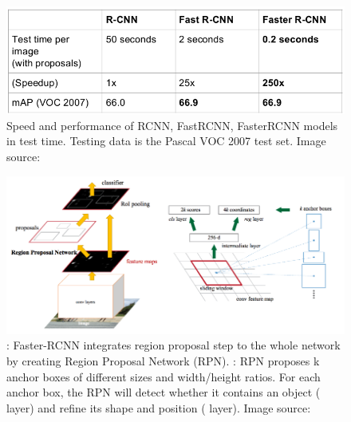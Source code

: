 \begin{figure}[tb]
	\centering
	\includegraphics[width=0.8\hsize]{./figures/rcnnCompair}
	\caption{Speed and performance of RCNN, FastRCNN, FasterRCNN models in test time. Testing data is the Pascal VOC 2007 test set. Image source: \cite{cs231n}}
	\label{fig:rcnnCompair}
\end{figure}

\begin{figure}[tb]
	\centering
	\includegraphics[width=1.0\hsize]{./figures/fasterRCNNfull}
	\caption{: Faster-RCNN integrates region proposal step to the whole network by creating Region Proposal Network (RPN). : RPN proposes k anchor boxes of different sizes and width/height ratios. For each anchor box, the RPN will detect whether it contains an object ( layer) and refine its shape and position ( layer). Image source: \cite{DBLP:journals/corr/RenHG015}}
	\label{fig:fasterRCNNfull}
\end{figure}

